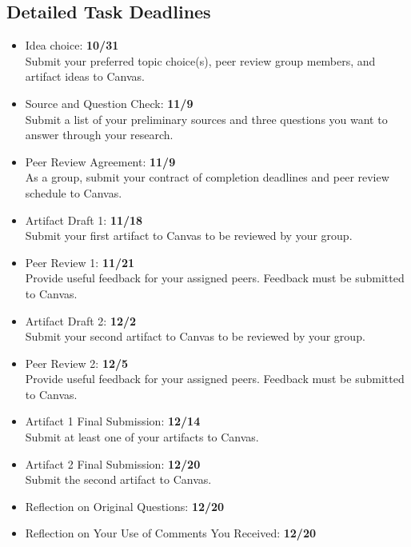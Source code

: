\documentclass[12pt]{article}
\begin{document}
	\subsection*{Detailed Task Deadlines}
	\begin{itemize}
		\item Idea choice: \textbf{10/31} \\
		Submit your preferred topic choice(s), peer review group members, and artifact ideas to Canvas.
		\item Source and Question Check: \textbf{11/9} \\
		Submit a list of your preliminary sources and three questions you want to answer through your research.
		\item Peer Review Agreement: \textbf{11/9}\\
		As a group, submit your contract of completion deadlines and peer review schedule to Canvas.
		\item Artifact Draft 1: \textbf{11/18}\\
		Submit your first artifact to Canvas to be reviewed by your group.
		\item Peer Review 1: \textbf{11/21}\\
		Provide useful feedback for your assigned peers. Feedback must be submitted to Canvas.
		\item Artifact Draft 2: \textbf{12/2}\\
		Submit your second artifact to Canvas to be reviewed by your group.
		\item Peer Review 2: \textbf{12/5}\\
		Provide useful feedback for your assigned peers. Feedback must be submitted to Canvas.
		\item Artifact 1 Final Submission: \textbf{12/14}\\
		Submit at least one of your artifacts to Canvas.
		\item Artifact 2 Final Submission: \textbf{12/20}\\	
		Submit the second artifact to Canvas.
		\item Reflection on Original Questions: \textbf{12/20}
		\item Reflection on Your Use of Comments You Received: \textbf{12/20}
	\end{itemize}
\end{document}
